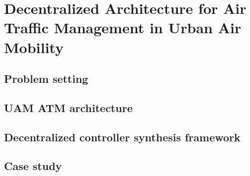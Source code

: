 








%




\chapter{Decentralized Architecture for Air Traffic Management in Urban Air Mobility}


\section {Problem setting}

%
\section{UAM ATM architecture} \label{sec:Motivation}




\section{Decentralized controller synthesis framework}\label{sec:distshield}

%
%
\section{Case study}\label{sec:experiments}



